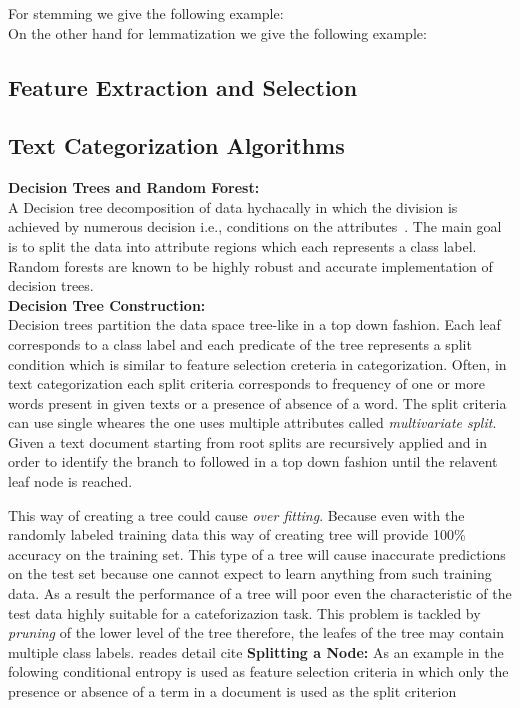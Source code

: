 For stemming we give the following example:\\

On the other hand for lemmatization we give the following example:\\


\subsection{Feature Extraction and Selection}


\subsection{Text Categorization Algorithms}
\textbf{Decision Trees and Random Forest:}\\
A Decision tree decomposition of data hychacally in which the division is achieved by numerous decision i.e., conditions on the attributes~\cite{book}. The main goal is to split the data into attribute regions which each represents a class label. Random forests are known to be highly robust and accurate implementation of decision trees. \\
\textbf{Decision Tree Construction:}\\
Decision trees partition the data space tree-like in a top down fashion. Each leaf corresponds to a class label and each predicate of the tree represents a split condition which is similar to feature selection creteria in categorization. Often, in text categorization each split criteria corresponds to frequency of one or more words present in given texts or a presence of absence of a word. The split criteria can use single wheares the one uses multiple attributes called \textit{multivariate split}.
Given a text document starting from root splits are recursively applied and in order to identify the branch to followed in a top down fashion until the relavent leaf node is reached. 

This way of creating a tree could cause \textit{over fitting}. Because even with the randomly labeled training data this way of creating tree will provide 100\% accuracy on the training set. This type of a tree will cause inaccurate predictions on the test set because one cannot expect to learn anything from such training data. As a result the performance of a tree will poor even the characteristic of the test data highly suitable for a cateforizazion task. This problem is tackled by \textit{pruning} of the lower level of the tree therefore, the leafes of the tree may contain multiple class labels. reades detail cite
\textbf{Splitting a Node:}
As an example in the folowing conditional entropy is used as feature selection criteria in which  only the presence or absence of a term in a document is used as the split criterion

